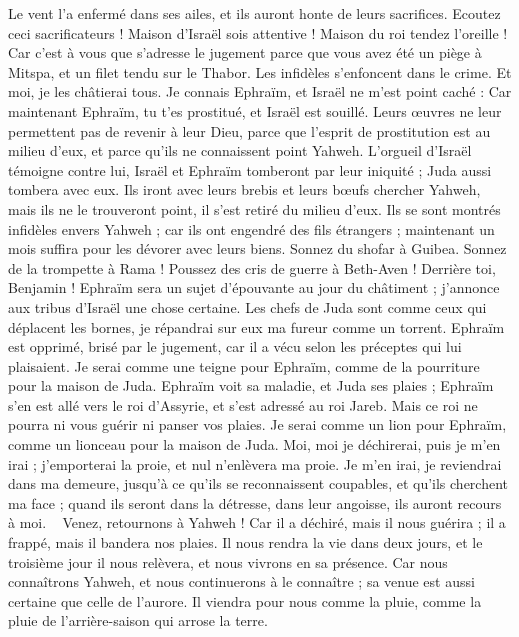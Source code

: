 \begin{multicols}{2}
Le vent l'a enfermé dans ses ailes, et ils auront honte de leurs sacrifices.
\VerseOne{}Ecoutez ceci sacrificateurs ! Maison d'Israël sois attentive ! Maison du roi tendez l'oreille ! Car c’est à vous que s’adresse le jugement parce que vous avez été un piège à Mitspa, et un filet tendu sur le Thabor.
Les infidèles s’enfoncent dans le crime. Et moi, je les châtierai tous.
Je connais Ephraïm, et Israël ne m'est point caché : Car maintenant Ephraïm, tu t’es prostitué, et Israël est souillé.
Leurs œuvres ne leur permettent pas de revenir à leur Dieu, parce que l'esprit de prostitution est au milieu d'eux, et parce qu’ils ne connaissent point Yahweh.
L’orgueil d'Israël témoigne contre lui, Israël et Ephraïm tomberont par leur iniquité ; Juda aussi tombera avec eux.
Ils iront avec leurs brebis et leurs bœufs chercher Yahweh, mais ils ne le trouveront point, il s'est retiré du milieu d’eux.
Ils se sont montrés infidèles envers Yahweh ; car ils ont engendré des fils étrangers ; maintenant un mois suffira pour les dévorer avec leurs biens.
Sonnez du shofar à Guibea. Sonnez de la trompette à Rama ! Poussez des cris de guerre à Beth-Aven ! Derrière toi, Benjamin !
Ephraïm sera un sujet d’épouvante au jour du châtiment ; j’annonce aux tribus d'Israël une chose certaine.
Les chefs de Juda sont comme ceux qui déplacent les bornes, je répandrai sur eux ma fureur comme un torrent.
Ephraïm est opprimé, brisé par le jugement, car il a vécu selon les préceptes qui lui plaisaient.
Je serai comme une teigne pour Ephraïm, comme de la pourriture pour la maison de Juda.
Ephraïm voit sa maladie, et Juda ses plaies ; Ephraïm s'en est allé vers le roi d'Assyrie, et s’est adressé au roi Jareb. Mais ce roi ne pourra ni vous guérir ni panser vos plaies.
Je serai comme un lion pour Ephraïm, comme un lionceau pour la maison de Juda. Moi, moi je déchirerai, puis je m'en irai ; j'emporterai la proie, et nul n’enlèvera ma proie.
Je m'en irai, je reviendrai dans ma demeure, jusqu'à ce qu'ils se reconnaissent coupables, et qu'ils cherchent ma face ; quand ils seront dans la détresse, dans leur angoisse, ils auront recours à moi.
\
\VerseOne{}Venez, retournons à Yahweh ! Car il a déchiré, mais il nous guérira ; il a frappé, mais il bandera nos plaies.
\VS{2}Il nous rendra la vie dans deux jours, et le troisième jour il nous relèvera, et nous vivrons en sa présence.
\VS{3}Car nous connaîtrons Yahweh, et nous continuerons à le connaître ; sa venue est aussi certaine que celle de l’aurore. Il viendra pour nous comme la pluie, comme la pluie de l’arrière-saison qui arrose la terre.

\end{multicols}
